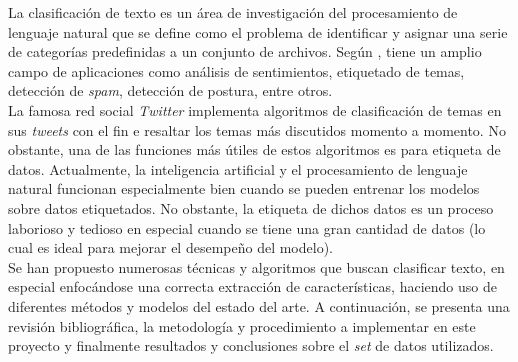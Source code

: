 La clasificación de texto es un área de investigación del procesamiento de lenguaje natural que se define como el problema de identificar y asignar una serie de categorías predefinidas a un conjunto de archivos. Según \cite{mokey_learn}, tiene un amplio campo de aplicaciones como análisis de sentimientos, etiquetado de temas, detección de \textit{spam}, detección de postura, entre otros.\\

La famosa red social \textit{Twitter} implementa algoritmos de clasificación de temas en sus \textit{tweets} con el fin e resaltar los temas más discutidos momento a momento. No obstante, una de las funciones más útiles de estos algoritmos es para etiqueta de datos. Actualmente, la inteligencia artificial y el procesamiento de lenguaje natural funcionan especialmente bien cuando se pueden entrenar los modelos sobre datos etiquetados. No obstante, la etiqueta de dichos datos es un proceso laborioso y tedioso en especial cuando se tiene una gran cantidad de datos (lo cual es ideal para mejorar el desempeño del modelo).\\

Se han propuesto numerosas técnicas y algoritmos que buscan clasificar texto, en especial enfocándose una correcta extracción de características, haciendo uso de diferentes métodos y modelos del estado del arte. A continuación, se presenta una revisión bibliográfica, la metodología y procedimiento a implementar en este proyecto y finalmente resultados y conclusiones sobre el \textit{set} de datos utilizados.

\newpage